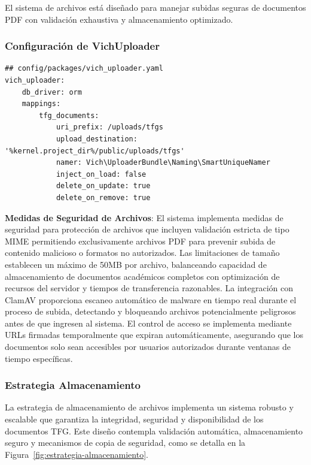 \documentclass[12pt,a4paper,oneside]{report}
\begin{document}
El sistema de archivos está diseñado para manejar subidas seguras de
documentos PDF con validación exhaustiva y almacenamiento optimizado.

\subsubsection{Configuración de
VichUploader}\label{configuraciuxf3n-de-vichuploader}

\begin{lstlisting}
## config/packages/vich_uploader.yaml
vich_uploader:
    db_driver: orm
    mappings:
        tfg_documents:
            uri_prefix: /uploads/tfgs
            upload_destination: '%kernel.project_dir%/public/uploads/tfgs'
            namer: Vich\UploaderBundle\Naming\SmartUniqueNamer
            inject_on_load: false
            delete_on_update: true
            delete_on_remove: true
\end{lstlisting}

\textbf{Medidas de Seguridad de Archivos}: El sistema implementa medidas de seguridad para protección de archivos que incluyen validación estricta de tipo MIME permitiendo exclusivamente archivos PDF para prevenir subida de contenido malicioso o formatos no autorizados. Las limitaciones de tamaño establecen un máximo de 50MB por archivo, balanceando capacidad de almacenamiento de documentos académicos completos con optimización de recursos del servidor y tiempos de transferencia razonables. La integración con ClamAV proporciona escaneo automático de malware en tiempo real durante el proceso de subida, detectando y bloqueando archivos potencialmente peligrosos antes de que ingresen al sistema. El control de acceso se implementa mediante URLs firmadas temporalmente que expiran automáticamente, asegurando que los documentos solo sean accesibles por usuarios autorizados durante ventanas de tiempo específicas.

\subsubsection{Estrategia
Almacenamiento}\label{estrategia-almacenamiento}

La estrategia de almacenamiento de archivos implementa un sistema robusto y escalable que garantiza la integridad, seguridad y disponibilidad de los documentos TFG. Este diseño contempla validación automática, almacenamiento seguro y mecanismos de copia de seguridad, como se detalla en la Figura~\ref{fig:estrategia-almacenamiento}.
\end{document}
